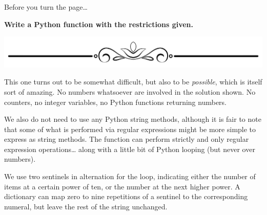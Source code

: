 \begin{Shaded}
\begin{Highlighting}[]
\OperatorTok{\textgreater{}\textgreater{}\textgreater{}}
\CommentTok{\textquotesingle{}120\textquotesingle{}}
\OperatorTok{\textgreater{}\textgreater{}\textgreater{}}
\CommentTok{\textquotesingle{}152\textquotesingle{}}
\OperatorTok{\textgreater{}\textgreater{}\textgreater{}}
\CommentTok{\textquotesingle{}74\textquotesingle{}}
\OperatorTok{\textgreater{}\textgreater{}\textgreater{}}
\CommentTok{\textquotesingle{}109\textquotesingle{}}
\end{Highlighting}
\end{Shaded}

Before you turn the page\ldots{}

\textbf{Write a Python function with the restrictions given.}

\includegraphics{images/Elegant-Flourish-Frame-Extrapolated-19.svg}

\newpage

This one turns out to be somewhat difficult, but also to be
\emph{possible}, which is itself sort of amazing. No numbers whatsoever
are involved in the solution shown. No counters, no integer variables,
no Python functions returning numbers.

We also do not need to use any Python string methods, although it is
fair to note that some of what is performed via regular expressions
might be more simple to express as string methods. The function can
perform strictly and only regular expression operations\ldots{} along
with a little bit of Python looping (but never over numbers).

We use two sentinels in alternation for the loop, indicating either the
number of items at a certain power of ten, or the number at the next
higher power. A dictionary can map zero to nine repetitions of a
sentinel to the corresponding numeral, but leave the rest of the string
unchanged.

